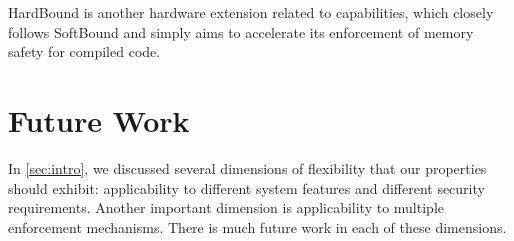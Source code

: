 \documentclass[10pt,conference]{ieeetran}%
\theoremstyle{definition}
\begin{document}

HardBound \cite{DeviettiBMZ08} is another hardware extension related to
capabilities, which closely follows SoftBound \cite{NagarakatteZMZ09} and
simply aims to accelerate its enforcement of memory safety for compiled code.

\section{Future Work}
\label{sec:future}

In \cref{sec:intro}, we discussed several dimensions of flexibility
that our properties should exhibit: applicability to different system
features and different security requirements. Another important dimension
is applicability to multiple enforcement mechanisms.   There is much future work in each of these dimensions.

\end{document}
